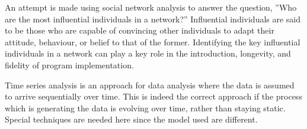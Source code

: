 
An attempt is made using social network analysis to answer the question, ”Who are the most influential individuals in a network?” Influential individuals are said to be those who are capable of convincing other individuals to adapt their attitude, behaviour, or belief to that of the former. Identifying the key influential individuals in a network can play a key role in the introduction, longevity, and fidelity of program implementation.



Time series analysis is an approach for data analysis where the data is assumed to arrive
sequentially over time. This is indeed the correct approach if the process which is generating the
data is evolving over time, rather than staying static. Special techniques are needed here
since the model used are different.



